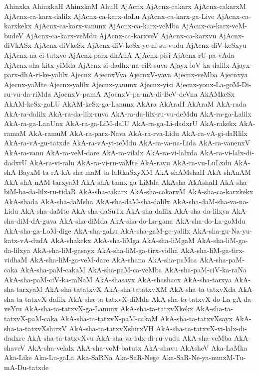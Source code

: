 {Ahinxka
AhinxkaH
AhinxkaM
AhuH
AjAcnx
AjAcnx-cakarx
AjAcnx-cakarxM
AjAcnx-ca-karx-dalilx
AjAcnx-ca-karx-doLu
AjAcnx-ca-karx-ga-Live
AjAcnx-ca-karxkekx
AjAcnx-ca-karx-vanunx
AjAcnx-ca-karx-veMba
AjAcnx-ca-karx-veM-budeV
AjAcnx-ca-karx-veMdu
AjAcnx-ca-karxveV
AjAcnx-ca-karxvu
AjAcnx-diVkASx
AjAcnx-diVkeSx
AjAcnx-diV-keSx-ye-ni-su-vudu
AjAcnx-diV-keSxyu
AjAcnx-na-ci-tutxve
AjAcnx-parx-dhAnA
AjAcnx-pisi
AjAcnx-rU-pa-vAda
AjAcnx-sha-kitx-yiMda
AjAcnx-si-dadhx-na-ciR-suva
Ajayx-loV-ka-dalilx
Ajayx-parx-dhA-ri-ke-yalilx
Ajecnx
AjecnxVya
AjecnxV-yava
Ajecnx-veMba
Ajecnxya
Ajecnx-yaMte
Ajecnx-yalilx
Ajecnx-yanunx
Ajecnx-yisi
Ajecnx-yonx-La-goM-Di-ru-vu-da-riMda
AjocnxV-pamA
AjocnxV-pa-mA-di-BeV-deVna
AkAMkeSx
AkAM-keSx-gaLU
AkAM-keSx-ga-Lanunx
AkAra
AkAraH
AkAraM
AkA-rada
AkA-ra-dalilx
AkA-ra-da-lilx-ruva
AkA-ra-da-lilx-ru-vu-deMdu
AkA-ra-ga-Lalilx
AkA-ra-ga-LanUnx
AkA-ra-ga-LiM-dalU
AkA-ra-ga-Li-dadxrU
AkA-rakekx
AkA-ramaM
AkA-ramuM
AkA-ra-parx-Nava
AkA-ra-rva-Lidu
AkA-ra-vA-gi-daRlilx
AkA-ra-vA-gu-tatxde
AkA-ra-vA-yi-teMdu
AkA-ra-va-na-Lida
AkA-ra-vanenxV
AkA-ra-vanu
AkA-ra-veM-dare
AkA-ra-vilalx
AkA-ra-vi-lalxda
AkA-ra-vi-lalx-di-dadxrU
AkA-ra-vi-ralu
AkA-ra-vi-ru-vaMte
AkA-ravu
AkA-ra-vu-LuLxdu
AkA-shA-BayxM-ta-rA-kA-sha-maM-ta-laRkaSxyXM
AkA-shAMshaH
AkA-shAnAM
AkA-shA-nAM-tarxyaM
AkA-shA-tamx-ga-LiMda
AkAsha
AkAshaH
AkA-sha-biM-ba-da-lilx-ru-tidaR
AkA-sha-cakarx
AkA-sha-cakarxM
AkA-sha-ca-karxkekx
AkA-shada
AkA-sha-daMsha
AkA-sha-daM-sha-dalilx
AkA-sha-daM-sha-va-na-Lidu
AkA-sha-daMte
AkA-sha-daSuTx
AkA-sha-dalilx
AkA-sha-da-lilxya
AkA-sha-diM-dA-guva
AkA-sha-diMda
AkA-sha-do-La-gana
AkA-sha-do-La-goMdu
AkA-sha-ga-LoM-dige
AkA-sha-gaLu
AkA-sha-gaM-ge-yalilx
AkA-sha-gu-Na-yu-katx-vA-dudA
AkA-shakekx
AkA-sha-liMga
AkA-sha-liMgaM
AkA-sha-liM-ga-da-lilxya
AkA-sha-liM-gasayx
AkA-sha-liM-ga-tirx-vidha
AkA-sha-liM-ga-tirx-vidhaM
AkA-sha-liM-ga-veM-dare
AkA-shana
AkA-sha-paMca
AkA-sha-paM-caka
AkA-sha-paM-cakaM
AkA-sha-paM-ca-veMba
AkA-sha-paM-ciV-ka-raNa
AkA-sha-paM-ciV-ka-raNaM
AkA-shasayx
AkA-shashacx
AkA-sha-tarxya
AkA-sha-tarxyaM
AkA-sha-tatatxvX
AkA-sha-tatatxvXM
AkA-sha-ta-tatxvXda
AkA-sha-ta-tatxvX-dalilx
AkA-sha-ta-tatxvX-diMda
AkA-sha-ta-tatxvX-do-La-gA-da-veYru
AkA-sha-ta-tatxvX-ga-Lanunx
AkA-sha-ta-tatxvXkekx
AkA-sha-ta-tatxvX-paM-caka
AkA-sha-ta-tatxvX-paM-cakaM
AkA-sha-ta-tatxvXsayx
AkA-sha-ta-tatxvXshirxV
AkA-sha-ta-tatxvXshirxVH
AkA-sha-ta-tatxvX-vi-lalx-di-dadxre
AkA-sha-ta-tatxvXvu
AkA-sha-va-lalx-di-ru-vudu
AkA-sha-veMba
AkA-shaveV
AkA-sha-velalx
AkA-sha-voM-batutx
AkA-shavu
AkAsheV
Aka-LaMka
Aka-Like
Aka-Lu-gaLa
Aka-SaRNa
Aka-SaR-Nege
Aka-SaR-Ne-ya-nunxM-Tu-mA-Du-tatxde
}

